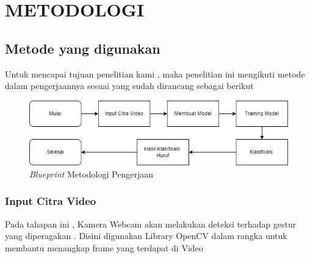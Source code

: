 \section{METODOLOGI}


\subsection{Metode yang digunakan}

Untuk mencapai tujuan penelitian kami , maka penelitian ini mengikuti metode dalam pengerjaannya sesuai yang sudah dirancang sebagai berikut

\begin{figure} [ht] \centering
  \includegraphics[scale=0.7]{gambar/Metodologi_TA_Baru.jpg}
  \caption{\emph{Blueprint} Metodologi Pengerjaan}
  \label{fig:Blueprint}
\end{figure}

\subsubsection{Input Citra Video}
Pada tahapan ini , Kamera Webcam akan melakukan deteksi terhadap gestur yang diperagakan . Disini digunakan Library OpenCV dalam rangka untuk membantu menangkap frame yang terdapat di Video 

